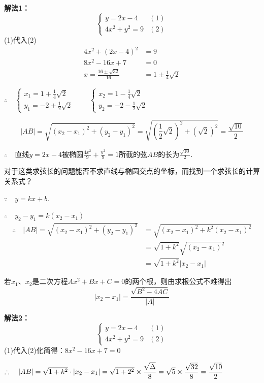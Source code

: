 \begin{solution}
\textbf{解法1：}
\[\begin{cases}
    y=2x-4&(1)\\
    4x^2+y^2=9&(2)
\end{cases}\]
(1)代入(2)
\[\begin{split}
    4x^2+(2x-4)^2&=9\\
8x^2-16x+7&=0\\
x=\frac{16\pm\sqrt{32}}{16}&=1\pm\frac{1}{4}\sqrt{2}
\end{split}\]

$\therefore\quad \begin{cases}
    x_1=1+\frac{1}{4}\sqrt{2}\\[1.5ex]
    y_1=-2+\frac{1}{2}\sqrt{2}
\end{cases} \qquad \begin{cases}
    x_2=1-\frac{1}{4}\sqrt{2}\\[1.5ex]
    y_2=-2-\frac{1}{2}\sqrt{2}
\end{cases}$

\[|AB|=\sqrt{(x_2-x_1)^2+(y_2-y_1)^2}=\sqrt{\left(\frac{1}{2}\sqrt{2}\right)^2+\left(\sqrt{2}\right)^2}=\frac{\sqrt{10}}{2}\]

$\therefore\quad $直线$y=2x-4$被椭圆$\frac{4x^2}{9}+\frac{y^2}{9}=1$所截的弦$AB$的长为$\frac{\sqrt{10}}{2}$.


\begin{analyze}
    对于这类求弦长的问题能否不求直线与椭圆交点的坐标，而找到一个求弦长的计算关系式？

$\because\quad y=kx+b$.

$\therefore\quad y_2-y_1=k(x_2-x_1)$
\[\begin{split}
    \therefore\quad |AB|=\sqrt{(x_2-x_1)^2+(y_2-y_1)^2}&=\sqrt{(x_2-x_1)^2+k^2(x_2-x_1)^2}\\
    &=\sqrt{1+k^2}\sqrt{(x_2-x_1)^2}\\
    &=\sqrt{1+k^2}|x_2-x_1|
\end{split}\]

若$x_1$、$x_2$是二次方程$Ax^2+Bx+C=0$的两个根，则由求根公式不难得出
\[|x_2-x_1|=\frac{\sqrt{B^2-4AC}}{|A|}\]
\end{analyze}


\textbf{解法2：}
\[\begin{cases}
    y=2x-4&(1)\\
    4x^2+y^2=9&(2)
\end{cases}\]
(1)代入(2)化简得：$8x^2-16x+7=0$

$\therefore\quad |AB|=\sqrt{1+k^2}\cdot |x_2-x_1|=\sqrt{1+2^2}\times \dfrac{\sqrt{\Delta}}{8}=\sqrt{5}\times \dfrac{\sqrt{32}}{8}=\dfrac{\sqrt{10}}{2}$
\end{solution}


